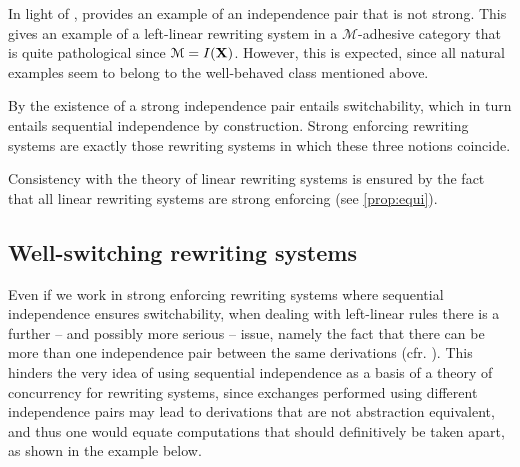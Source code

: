 \documentclass[a4paper,UKenglish,cleveref,pdftex,thm-restate,numberwithinsect]{lipics-v2021}
\newcommand{\full}[1]{{color{blue}#1}}
\newcommand{\full}[1]{}
\newcommand{\cat}[1]{\ensuremath{\mathbf{#1}}}
\def\R{\mathsf{R}}
\def\X{\textbf {\textup{X}}}
\begin{document}
\begin{example}
  \label{ex:diff2}
  In light of ,  provides an example of
  an independence pair that is not strong. This gives an example of a
  left-linear rewriting system in a $\mathcal{M}$-adhesive category that is quite
  pathological since $\mathcal{M}=\mathsf{I(\X)}$. However, this is expected, 
  since all natural examples seem to belong to the well-behaved class mentioned above. 
\end{example}

\begin{remark}
  By  the existence of a strong independence pair
  entails switchability, which in turn entails sequential
  independence by construction. Strong enforcing rewriting systems are exactly
  those rewriting systems in which these three notions coincide.
\end{remark}

Consistency with the theory of linear rewriting systems is ensured by the fact that all linear rewriting systems are strong enforcing (see \cref{prop:equi}).


\subsection{Well-switching rewriting systems}
\label{subsec:verytame}

Even if we work in strong enforcing rewriting systems where sequential
independence ensures switchability, when dealing with left-linear
rules there is a further -- and possibly more serious -- issue, 
namely the fact that there can be more than one independence pair between
the same derivations (cfr. ). This hinders the very idea of using
sequential independence as a basis of a theory of concurrency for
rewriting systems, since exchanges performed using different
independence pairs may lead to derivations that are not abstraction
equivalent, and thus one would equate computations that should
definitively be taken apart, as shown in the example below.
\end{document}
